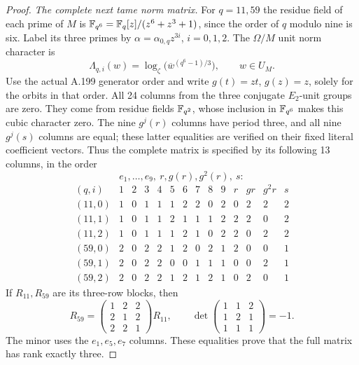 \begin{proof}
\emph{The complete next tame norm matrix.}
For \(q=11,59\) the residue field of each prime of \(M\)
is \(\mathbb F_{q^6}=\mathbb F_q[z]/(z^6+z^3+1)\), since the order
of \(q\) modulo nine is six.  Label its three primes by
\(\alpha=\alpha_{0,q}z^{3i}\), \(i=0,1,2\).  The
\(\Omega/M\) unit norm character is
\[
 \Lambda_{q,i}(w)=
   \log_\zeta\bigl(\overline w^{(q^6-1)/3}\bigr),
       \qquad w\in U_M.
\tag{A.208.16}
\]
Use the actual A.199 generator order and write \(g(t)=zt\),
\(g(z)=z\), solely for the orbits in that order.  All 24
columns from the three conjugate \(E_2\)-unit groups are zero.
They come from residue fields \(\mathbb F_{q^2}\), whose inclusion
in \(\mathbb F_{q^6}\) makes this cubic character zero.
The nine \(g^j(r)\) columns have period three, and all nine
\(g^j(s)\) columns are equal; these latter equalities are
verified on their fixed literal coefficient vectors.
Thus the complete matrix is specified by its following 13
columns, in the order
\[
                  e_1,\ldots,e_9,\ r,g(r),g^2(r),\ s:
\tag{A.208.17}
\]
\[
\begin{array}{c|rrrrrrrrr|rrr|r}
 (q,i)&1&2&3&4&5&6&7&8&9&r&gr&g^2r&s\\\hline
 (11,0)&1&0&1&1&1&2&2&0&2&0&2&2&2\\
 (11,1)&1&0&1&1&2&1&1&1&2&2&2&0&2\\
 (11,2)&1&0&1&1&1&2&1&0&2&2&0&2&2\\\hline
 (59,0)&2&0&2&2&1&2&0&2&1&2&0&0&1\\
 (59,1)&2&0&2&2&0&0&1&1&1&0&0&2&1\\
 (59,2)&2&0&2&2&1&2&1&2&1&0&2&0&1
\end{array}
\tag{A.208.18}
\]
If \(R_{11},R_{59}\) are its three-row blocks, then
\[
 R_{59}=\begin{pmatrix}1&2&2\\2&1&2\\2&2&1\end{pmatrix}R_{11},
 \qquad
 \det\begin{pmatrix}1&1&2\\1&2&1\\1&1&1\end{pmatrix}=-1.
\tag{A.208.19}
\]
The minor uses the \(e_1,e_5,e_7\) columns.  These equalities
prove that the full matrix has rank exactly three.


\end{proof}
